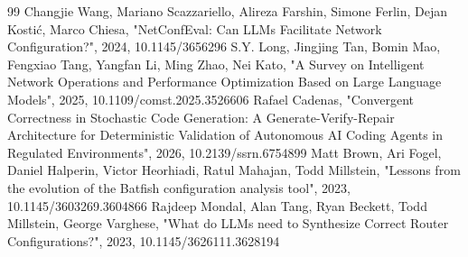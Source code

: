 \documentclass[conference]{IEEEtran}
\begin{document}
\begin{thebibliography}{99}
 Changjie Wang, Mariano Scazzariello, Alireza Farshin, Simone Ferlin, Dejan Kostić, Marco Chiesa, "NetConfEval: Can LLMs Facilitate Network Configuration?", 2024, 10.1145/3656296
 S.Y. Long, Jingjing Tan, Bomin Mao, Fengxiao Tang, Yangfan Li, Ming Zhao, Nei Kato, "A Survey on Intelligent Network Operations and Performance Optimization Based on Large Language Models", 2025, 10.1109/comst.2025.3526606
 Rafael Cadenas, "Convergent Correctness in Stochastic Code Generation: A Generate-Verify-Repair Architecture for Deterministic Validation of Autonomous AI Coding Agents in Regulated Environments", 2026, 10.2139/ssrn.6754899
 Matt Brown, Ari Fogel, Daniel Halperin, Victor Heorhiadi, Ratul Mahajan, Todd Millstein, "Lessons from the evolution of the Batfish configuration analysis tool", 2023, 10.1145/3603269.3604866
 Rajdeep Mondal, Alan Tang, Ryan Beckett, Todd Millstein, George Varghese, "What do LLMs need to Synthesize Correct Router Configurations?", 2023, 10.1145/3626111.3628194
\end{thebibliography}
\end{document}
